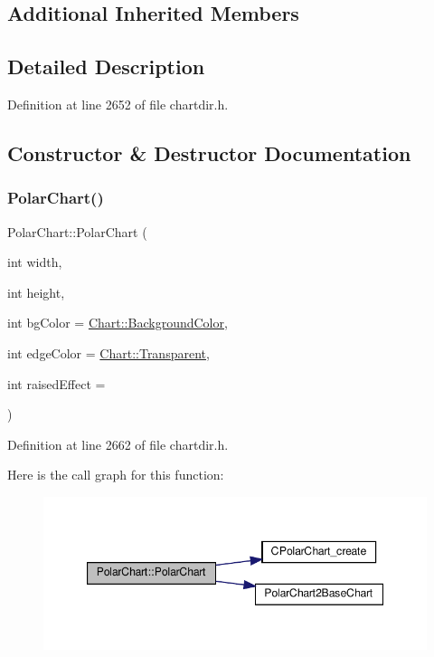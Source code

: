 \subsection*{Additional Inherited Members}


\subsection{Detailed Description}


Definition at line 2652 of file chartdir.\+h.



\subsection{Constructor \& Destructor Documentation}
\mbox{\label{class_polar_chart_a7269b9fccbcc87f5590c6310b67b195b}} 
\subsubsection{\texorpdfstring{Polar\+Chart()}{PolarChart()}}
{\footnotesize\ttfamily Polar\+Chart\+::\+Polar\+Chart (\begin{DoxyParamCaption}\item[{int}]{width,  }\item[{int}]{height,  }\item[{int}]{bg\+Color = {\ttfamily \hyperlink{namespace_chart_abee0d882fdc9ad0b001245ad9fc64011a134193bde693b9d152d0c6dc59fa7d7f}{Chart\+::\+Background\+Color}},  }\item[{int}]{edge\+Color = {\ttfamily \hyperlink{namespace_chart_abee0d882fdc9ad0b001245ad9fc64011afc6811800a9e2582dac0157b6279f836}{Chart\+::\+Transparent}},  }\item[{int}]{raised\+Effect = {} }\end{DoxyParamCaption})\hspace{0.3cm}{\ttfamily [inline]}}



Definition at line 2662 of file chartdir.\+h.

Here is the call graph for this function\+:
\nopagebreak
\begin{figure}[H]
\begin{center}
\leavevmode
\includegraphics[width=347pt]{class_polar_chart_a7269b9fccbcc87f5590c6310b67b195b_cgraph}
\end{center}
\end{figure}


